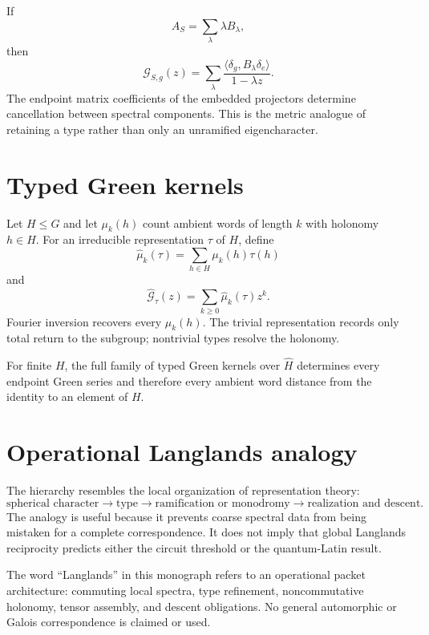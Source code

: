 If
\[
A_S=\sum_\lambda \lambda B_\lambda,
\]
then
\[
\mathcal G_{S,g}(z)
=
\sum_\lambda
\frac{\langle\delta_g,B_\lambda\delta_e\rangle}{1-\lambda z}.
\]
The endpoint matrix coefficients of the embedded projectors determine cancellation between spectral components.  This is the metric analogue of retaining a type rather than only an unramified eigencharacter.

\section{Typed Green kernels}
Let $H\le G$ and let $\mu_k(h)$ count ambient words of length $k$ with holonomy $h\in H$.  For an irreducible representation $\tau$ of $H$, define
\[
\widehat\mu_k(\tau)
=
\sum_{h\in H}\mu_k(h)\tau(h)
\]
and
\[
\widehat{\mathcal G}_\tau(z)
=
\sum_{k\ge0}\widehat\mu_k(\tau)z^k.
\]
Fourier inversion recovers every $\mu_k(h)$.  The trivial representation records only total return to the subgroup; nontrivial types resolve the holonomy.

\begin{provedbox}
For finite $H$, the full family of typed Green kernels over $\widehat H$ determines every endpoint Green series and therefore every ambient word distance from the identity to an element of $H$.
\end{provedbox}

\section{Operational Langlands analogy}
The hierarchy resembles the local organization of representation theory:
\[
\text{spherical character}
\to
\text{type}
\to
\text{ramification or monodromy}
\to
\text{realization and descent}.
\]
The analogy is useful because it prevents coarse spectral data from being mistaken for a complete correspondence.  It does not imply that global Langlands reciprocity predicts either the circuit threshold or the quantum-Latin result.

\begin{boundarybox}
The word ``Langlands'' in this monograph refers to an operational packet architecture: commuting local spectra, type refinement, noncommutative holonomy, tensor assembly, and descent obligations.  No general automorphic or Galois correspondence is claimed or used.
\end{boundarybox}

